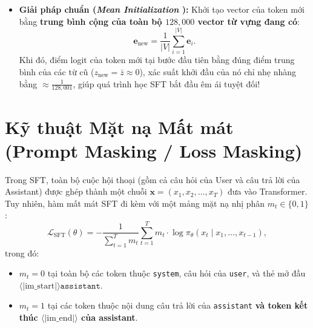 \begin{mathdecode}
\begin{itemize}[leftmargin=1.2cm]
    \item \textbf{Giải pháp chuẩn (\textit{Mean Initialization} \citealt{hewitt2021initializing}):} Khởi tạo vector của token mới bằng \textbf{trung bình cộng của toàn bộ $128,000$ vector từ vựng đang có}:
    \begin{equation}
        \mathbf{e}_{\text{new}} = \frac{1}{|V|} \sum_{i=1}^{|V|} \mathbf{e}_i.
        \label{eq:mean_init_eng}
    \end{equation}
    Khi đó, điểm logit của token mới tại bước đầu tiên bằng đúng điểm trung bình của các từ cũ ($z_{\text{new}} = \bar{z} \approx 0$), xác suất khởi đầu của nó chỉ nhẹ nhàng bằng $\approx \frac{1}{128,001}$, giúp quá trình học SFT bắt đầu êm ái tuyệt đối!
\end{itemize}
\end{mathdecode}

\section{Kỹ thuật Mặt nạ Mất mát (Prompt Masking / Loss Masking)}
\label{sec:prompt_masking_eng}

Trong SFT, toàn bộ cuộc hội thoại (gồm cả câu hỏi của User và câu trả lời của Assistant) được ghép thành một chuỗi $\mathbf{x} = (x_1, x_2, \dots, x_T)$ đưa vào Transformer. Tuy nhiên, hàm mất mát SFT đi kèm với một mảng mặt nạ nhị phân $m_t \in \{0, 1\}$:
\begin{equation}
    \mathcal{L}_{\text{SFT}}(\theta) = -\frac{1}{\sum_{t=1}^{T} m_t} \sum_{t=1}^{T} m_t \cdot \log \pi_\theta(x_t \mid x_1, \dots, x_{t-1}),
    \label{eq:sft_loss_eng}
\end{equation}
trong đó:
\begin{itemize}[leftmargin=1.2cm]
    \item $m_t = 0$ tại toàn bộ các token thuộc \texttt{system}, câu hỏi của \texttt{user}, và thẻ mở đầu $\langle|\text{im\_start}|\rangle\texttt{assistant}$.
    \item $m_t = 1$ tại các token thuộc nội dung câu trả lời của \texttt{assistant} \textbf{và token kết thúc $\langle|\text{im\_end}|\rangle$ của assistant}.
\end{itemize}

